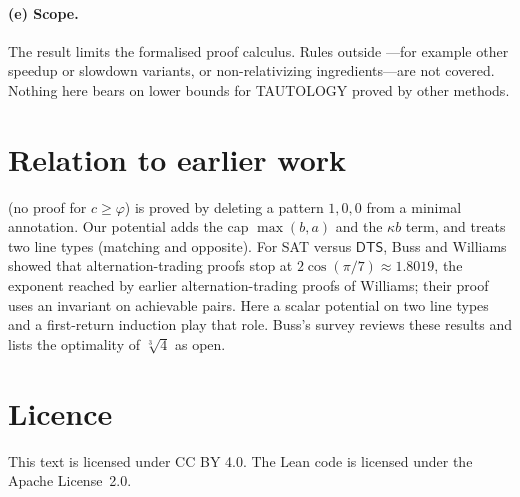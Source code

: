 \documentclass[11pt]{article}
\theoremstyle{definition}
\newcommand{\leanus}{\textunderscore\allowbreak}
\newcommand{\lean}[1]{\ifmmode\text{\ttfamily #1}\else{\ttfamily\let\_\leanus #1}\fi}
\newcommand{\cbrt}{\sqrt[3]{4}}
\begin{document}
\paragraph{(e) Scope.}
The result limits the formalised proof calculus. Rules outside \lean{WStepX}---for example other speedup or slowdown variants, or non-relativizing ingredients---are not covered. Nothing here bears on lower bounds for TAUTOLOGY proved by other methods.

\section{Relation to earlier work}

\cite[Theorem~6.9]{W13} (no proof for $c\ge\varphi$) is proved by deleting a pattern $1,0,0$ from a minimal annotation. Our potential adds the cap $\max(b,a)$ and the $\kappa b$ term, and treats two line types (matching and opposite). For SAT versus $\mathsf{DTS}$, Buss and Williams \cite{BW15} showed that alternation-trading proofs stop at $2\cos(\pi/7)\approx1.8019$, the exponent reached by earlier alternation-trading proofs of Williams; their proof uses an invariant on achievable pairs. Here a scalar potential on two line types and a first-return induction play that role. Buss's survey \cite{B13} reviews these results and lists the optimality of $\cbrt$ as open.

\section*{Licence}
This text is licensed under CC BY 4.0. The Lean code is licensed under the Apache License~2.0.
\end{document}
